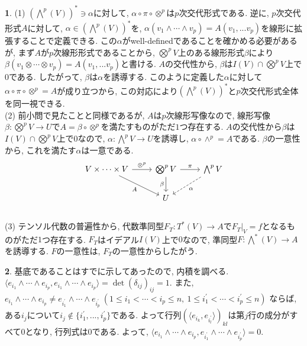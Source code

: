 \documentclass[dvipdfmx]{amsart}
\theoremstyle{definition}
\newtheorem{ans}{}
\numberwithin{ans}{section}
\numberwithin{mynote}{section}
\begin{document}
\begin{ans}
  (1) $(\bigwedge^p(V))^\ast \ni \alpha$に対して,
  $\alpha \circ \pi \circ \otimes^p$は$p$次交代形式である.
  逆に, $p$次交代形式$A$に対して, $\alpha \in (\bigwedge^p(V))^\ast$を,
  $\alpha(v_1 \wedge \cdots \wedge v_p) = A(v_1,... v_p)$を線形に拡張することで定義できる.
  この$\alpha$がwell-definedであることを確かめる必要があるが,
  まず$A$が$p$次線形形式であることから, $\bigotimes^pV$上のある線形形式$\beta$により
  $\beta(v_1 \otimes \cdots \otimes v_p) = A(v_1,... v_p)$と書ける.
  $A$の交代性から, $\beta$は$I(V) \cap \bigotimes^pV$上で$0$である. したがって, $\beta$は$\alpha$を誘導する.
  このように定義した$\alpha$に対して$\alpha \circ \pi \circ \otimes^p = A$が成り立つから,
  この対応により$(\bigwedge^p(V))^\ast$と$p$次交代形式全体を同一視できる.\\
  (2) 前小問で見たことと同様であるが, $A$は$p$次線形写像なので,
  線形写像$\beta: \bigotimes^pV \rightarrow U$で$A = \beta \circ \otimes^p$を満たすものがただ$1$つ存在する.
  $A$の交代性から$\beta$は$I(V) \cap \bigotimes^pV$上で$0$なので,
  $\alpha: \bigwedge^pV \rightarrow U$を誘導し, $\alpha \circ \wedge^p = A$である.
  $\beta$の一意性から, これを満たす$\alpha$は一意である.
  \[
    \begin{tikzcd}
      V \times \cdots \times V \ar[r, "\otimes^p"] \ar[rd, "A"'] &\bigotimes^pV \ar[d, "\beta"'] \ar[r, "\pi"] & \bigwedge^pV \ar[ld, dashed, "\alpha"]\\
      & U &
    \end{tikzcd}
  \]
  \\
  (3) テンソル代数の普遍性から, 代数準同型$F_T: T^\ast(V) \rightarrow A$で$F_T|_V = f$となるものがただ$1$つ存在する.
  $F_T$はイデアル$I(V)$上で$0$なので, 準同型$F: \bigwedge^\ast(V) \rightarrow A$を誘導する.
  $F$の一意性は, $F_T$の一意性からしたがう.
\end{ans}

\begin{ans}
  基底であることはすでに示してあったので, 内積を調べる.
  $\langle e_{i_1} \wedge \cdots \wedge e_{i_p}, e_{i_1} \wedge \cdots \wedge e_{i_p} \rangle
  = \det(\delta_{ij})_{ij} = 1$.
  また, $e_{i_1} \wedge \cdots \wedge e_{i_p} \neq e_{i^\prime_1} \wedge \cdots \wedge e_{i^\prime_p}\ (1 \le i_1 < \cdots < i_p \le n,\ 1 \le i^\prime_1 < \cdots < i^\prime_p \le n)$
  ならば, ある$i_j$について$i_j \notin \{i^\prime_1,..., i^\prime_p\}$である.
  よって行列$(\langle e_{i_k}, e_{i^\prime_l} \rangle)_{kl}$は第$j$行の成分がすべて$0$となり, 行列式は$0$である. よって,
  $\langle e_{i_1} \wedge \cdots \wedge e_{i_p} , e_{i^\prime_1} \wedge \cdots \wedge e_{i^\prime_p} \rangle = 0$.
\end{ans}
\end{document}
